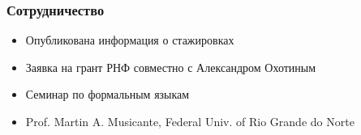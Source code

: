 \documentclass[xcolor=table]{beamer}
\begin{document}
\begin{frame}[fragile]
  \transwipe[direction=90]
  \frametitle{Сотрудничество}
\begin{itemize}
      \item Опубликована информация о стажировках
      \item Заявка на грант РНФ совместно с Александром Охотиным
      \item Семинар по формальным языкам
      \item Prof. Martin A. Musicante, Federal Univ. of Rio Grande do Norte
\end{itemize}
\end{frame}
\end{document}
